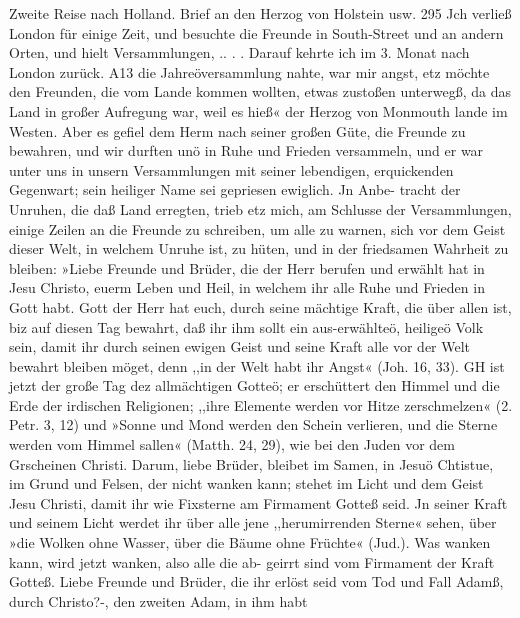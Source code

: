 Zweite Reise nach Holland. Brief an den Herzog von Holstein usw. 295
Jch verließ London für einige Zeit, und besuchte die Freunde
in South-Street und an andern Orten, und hielt Versammlungen,
.. . . Darauf kehrte ich im 3. Monat nach London zurück.
A13 die Jahreöversammlung nahte, war mir angst, etz möchte
den Freunden, die vom Lande kommen wollten, etwas zustoßen
unterwegß, da das Land in großer Aufregung war, weil es hieß«
der Herzog von Monmouth lande im Westen. Aber es gefiel
dem Herm nach seiner großen Güte, die Freunde zu bewahren, und
wir durften unö in Ruhe und Frieden versammeln, und er war unter
uns in unsern Versammlungen mit seiner lebendigen, erquickenden
Gegenwart; sein heiliger Name sei gepriesen ewiglich. Jn Anbe-
tracht der Unruhen, die daß Land erregten, trieb etz mich, am
Schlusse der Versammlungen, einige Zeilen an die Freunde zu
schreiben, um alle zu warnen, sich vor dem Geist dieser Welt, in
welchem Unruhe ist, zu hüten, und in der friedsamen Wahrheit
zu bleiben:
»Liebe Freunde und Brüder,
die der Herr berufen und erwählt hat in Jesu Christo,
euerm Leben und Heil, in welchem ihr alle Ruhe und Frieden
in Gott habt. Gott der Herr hat euch, durch seine mächtige
Kraft, die über allen ist, biz auf diesen Tag bewahrt, daß ihr
ihm sollt ein aus-erwählteö, heiligeö Volk sein, damit ihr durch
seinen ewigen Geist und seine Kraft alle vor der Welt bewahrt
bleiben möget, denn ,,in der Welt habt ihr Angst« (Joh. 16, 33).
GH ist jetzt der große Tag dez allmächtigen Gotteö; er erschüttert
den Himmel und die Erde der irdischen Religionen; ,,ihre Elemente
werden vor Hitze zerschmelzen« (2. Petr. 3, 12) und »Sonne und
Mond werden den Schein verlieren, und die Sterne werden vom
Himmel sallen« (Matth. 24, 29), wie bei den Juden vor dem
Grscheinen Christi. Darum, liebe Brüder, bleibet im Samen,
in Jesuö Chtistue, im Grund und Felsen, der nicht wanken
kann; stehet im Licht und dem Geist Jesu Christi, damit ihr wie
Fixsterne am Firmament Gotteß seid. Jn seiner Kraft und seinem
Licht werdet ihr über alle jene ,,herumirrenden Sterne« sehen,
über »die Wolken ohne Wasser, über die Bäume ohne Früchte«
(Jud.). Was wanken kann, wird jetzt wanken, also alle die ab-
geirrt sind vom Firmament der Kraft Gotteß.
Liebe Freunde und Brüder, die ihr erlöst seid vom Tod und
Fall Adamß, durch Christo?-, den zweiten Adam, in ihm habt


